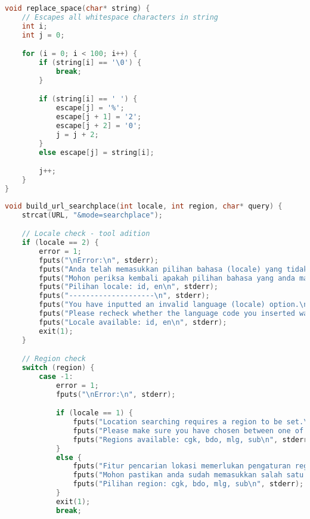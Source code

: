 \begin{lstlisting}[label={appdx:A-replacespace}, language=C, caption=\texttt{replace\textunderscore space()}]
void replace_space(char* string) {
    // Escapes all whitespace characters in string
    int i;
    int j = 0;

    for (i = 0; i < 100; i++) {
        if (string[i] == '\0') {
            break;
        }

        if (string[i] == ' ') {
            escape[j] = '%';
            escape[j + 1] = '2';
            escape[j + 2] = '0';
            j = j + 2;
        }
        else escape[j] = string[i];

        j++;
    }
}
\end{lstlisting}

\begin{lstlisting}[label={appdx:A-buildurl-searchplace}, language=C, caption=\texttt{build\textunderscore url\textunderscore searchplace()}]
void build_url_searchplace(int locale, int region, char* query) {
    strcat(URL, "&mode=searchplace");

    // Locale check - tool adition
    if (locale == 2) {
        error = 1;
        fputs("\nError:\n", stderr);
        fputs("Anda telah memasukkan pilihan bahasa (locale) yang tidak valid.\n", stderr);
        fputs("Mohon periksa kembali apakah pilihan bahasa yang anda masukkan valid atau tidak.\n", stderr);
        fputs("Pilihan locale: id, en\n", stderr);
        fputs("--------------------\n", stderr);
        fputs("You have inputted an invalid language (locale) option.\n", stderr);
        fputs("Please recheck whether the language code you inserted was supported or not.\n", stderr);
        fputs("Locale available: id, en\n", stderr);
        exit(1);
    }

    // Region check
    switch (region) {
        case -1:
            error = 1;
            fputs("\nError:\n", stderr);

            if (locale == 1) {
                fputs("Location searching requires a region to be set.\n", stderr);
                fputs("Please make sure you have chosen between one of the four available regions.\n", stderr);
                fputs("Regions available: cgk, bdo, mlg, sub\n", stderr);
            }
            else {
                fputs("Fitur pencarian lokasi memerlukan pengaturan region lokasi yang ingin dicari.\n", stderr);
                fputs("Mohon pastikan anda sudah memasukkan salah satu dari empat kode region yang tersedia.\n", stderr);
                fputs("Pilihan region: cgk, bdo, mlg, sub\n", stderr);
            }
            exit(1);
            break;
        

\end{lstlisting}
